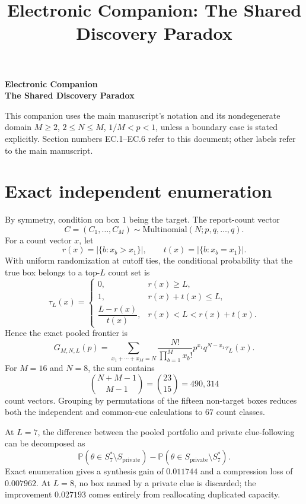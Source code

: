 \documentclass[11pt]{article}
\title{Electronic Companion: The Shared Discovery Paradox}
\author{}
\date{}
\theoremstyle{definition}
\theoremstyle{remark}
\newcommand{\Prob}{\mathbb{P}}
\newcommand{\1}{\mathbf{1}}
\newcommand{\priv}{\mathrm{private}}
\begin{document}
\begin{center}\Large\bfseries Electronic Companion\\[0.4em]\normalsize\normalfont The Shared Discovery Paradox\end{center}\vspace{1em}
This companion uses the main manuscript's notation and its nondegenerate domain $M\ge2$, $2\le N\le M$, $1/M<p<1$, unless a boundary case is stated explicitly. Section numbers EC.1--EC.6 refer to this document; other labels refer to the main manuscript.



\section{Exact independent enumeration}
\label{app:enumeration}

By symmetry, condition on box $1$ being the target. The report-count vector
\[
C=(C_1,\ldots,C_M)\sim\mathrm{Multinomial}(N;p,q,\ldots,q).
\]
For a count vector $x$, let
\[
r(x)=|\{b:x_b>x_1\}|,
\qquad
t(x)=|\{b:x_b=x_1\}|.
\]
With uniform randomization at cutoff ties, the conditional probability that the true box belongs to a top-$L$ count set is
\begin{equation}
\tau_L(x)=
\begin{cases}
0, & r(x)\ge L,\\
1, & r(x)+t(x)\le L,\\
\dfrac{L-r(x)}{t(x)}, & r(x)<L<r(x)+t(x).
\end{cases}
\label{eq:tie-inclusion}
\end{equation}
Hence the exact pooled frontier is
\begin{equation}
G_{M,N,L}(p)
=\sum_{x_1+\cdots+x_M=N}
\frac{N!}{\prod_{b=1}^M x_b!}
 p^{x_1}q^{N-x_1}\tau_L(x).
\label{eq:multinomial-frontier}
\end{equation}
For $M=16$ and $N=8$, the sum contains
\[
\binom{N+M-1}{M-1}=\binom{23}{15}=490{,}314
\]
count vectors. Grouping by permutations of the fifteen non-target boxes reduces both the independent and common-cue calculations to $67$ count classes.

At $L=7$, the difference between the pooled portfolio and private clue-following can be decomposed as
\[
\Prob(\theta\in S^*_7\setminus S_{\priv})
-\Prob(\theta\in S_{\priv}\setminus S^*_7).
\]
Exact enumeration gives a synthesis gain of $0.011744$ and a compression loss of $0.007962$. At $L=8$, no box named by a private clue is discarded; the improvement $0.027193$ comes entirely from reallocating duplicated capacity.
\end{document}

